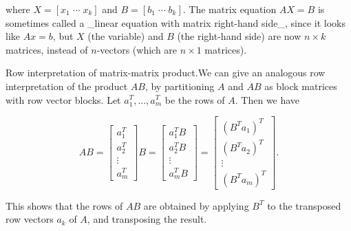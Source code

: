 where \(X=[x_{1}\;\cdots\;x_{k}]\) and \(B=[b_{1}\;\cdots\;b_{k}]\). The matrix equation \(AX=B\) is sometimes called a _linear equation with matrix right-hand side_, since it looks like \(Ax=b\), but \(X\) (the variable) and \(B\) (the right-hand side) are now \(n\times k\) matrices, instead of \(n\)-vectors (which are \(n\times 1\) matrices).

Row interpretation of matrix-matrix product.We can give an analogous row interpretation of the product \(AB\), by partitioning \(A\) and \(AB\) as block matrices with row vector blocks. Let \(a_{1}^{T},\ldots,a_{m}^{T}\) be the rows of \(A\). Then we have

\[AB=\left[\begin{array}{c}a_{1}^{T}\\ a_{2}^{T}\\ \vdots\\ a_{m}^{T}\end{array}\right]B=\left[\begin{array}{c}a_{1}^{T}B\\ a_{2}^{T}B\\ \vdots\\ a_{m}^{T}B\end{array}\right]=\left[\begin{array}{c}(B^{T}a_{1})^{T}\\ (B^{T}a_{2})^{T}\\ \vdots\\ (B^{T}a_{m})^{T}\end{array}\right].\]

This shows that the rows of \(AB\) are obtained by applying \(B^{T}\) to the transposed row vectors \(a_{k}\) of \(A\), and transposing the result.

 